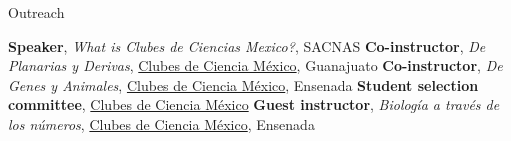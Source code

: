 \begin{rubric}{Outreach}

\entry*[2017]
	\textbf{Speaker}, \emph{What is Clubes de Ciencias Mexico?}, SACNAS
\entry*[2016]
	\textbf{Co-instructor}, \emph{De Planarias y Derivas},
	\href{http://www.clubesdeciencia.mx/}{Clubes de Ciencia México}, Guanajuato
\entry*[2016]
	  \textbf{Co-instructor}, \emph{De Genes y Animales},
		\href{http://www.clubesdeciencia.mx/}{Clubes de Ciencia México}, Ensenada
\entry*[2015]
	  \textbf{Student selection committee},
		\href{http://www.clubesdeciencia.mx/}{Clubes de Ciencia México}
\entry*[2014]
  \textbf{Guest instructor}, \emph{Biología a través de los números},
	\href{http://www.clubesdeciencia.mx/}{Clubes de Ciencia México}, Ensenada

\end{rubric}
